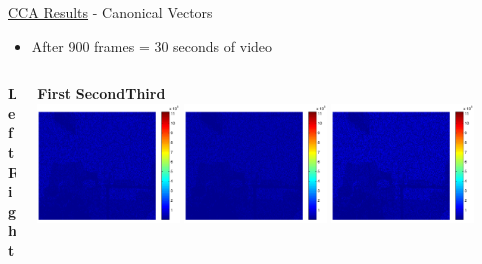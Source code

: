 \documentclass[8pt]{beamer}
\begin{document}
\begin{frame}{\href{run:/home/user/Documents/thesis_vids/flashing_cca.mp4}{CCA Results} -
    Canonical Vectors}

  \begin{itemize}
  \item After 900 frames = 30 seconds of video  
  \end{itemize}

  \begin{columns}
    \begin{column}{0.1\textwidth}
      \textbf{Left}\\
      \vspace{15ex}
      \textbf{Right}\\
    \end{column}
    \begin{column}{0.9\textwidth}
      \begin{center}
        \textbf{First} \hspace{15ex} \textbf{Second}\hspace{15ex}\textbf{Third}\\[1ex]
        \includegraphics[width=0.3\textwidth]{figures/flashing_cca_wx1.pdf}\hspace{1ex}
        \includegraphics[width=0.3\textwidth]{figures/flashing_cca_wx2.pdf}\hspace{1ex}
        \includegraphics[width=0.3\textwidth]{figures/flashing_cca_wx3.pdf}\\[2ex]

\end{center}
\end{column}
\end{columns}
\end{frame}
\end{document}
